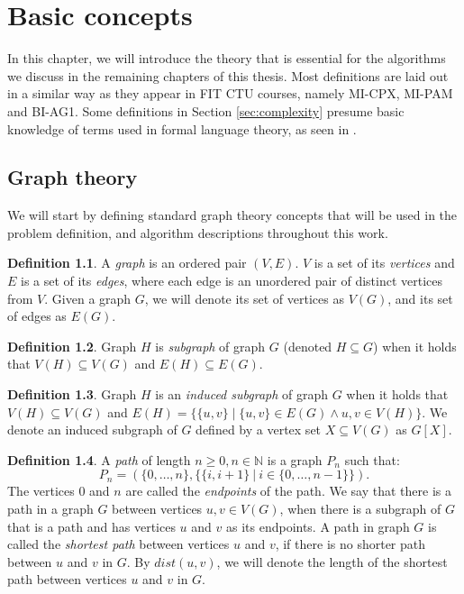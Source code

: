 \documentclass[thesis=M,english,hidelinks]{FITthesis}[2012/10/20]
\theoremstyle{definition}
\newtheorem{definition}{Definition}
\begin{document}

\chapter{Basic concepts}

In this chapter, we will introduce the theory that is essential for the algorithms we discuss in the remaining chapters of
this thesis. Most definitions are laid out in a similar way as they appear in FIT CTU courses, namely MI-CPX, MI-PAM and
BI-AG1. Some definitions in Section \ref{sec:complexity} presume basic knowledge of terms used in formal language
theory, as seen in \cite[p. 11]{Melichar2013}.

\section{Graph theory}

We will start by defining standard graph theory concepts that will be used in the problem definition, and algorithm
descriptions throughout this work. 

\begin{definition}
    A \emph{graph} is an ordered pair $(V, E)$. $V$ is a set of its \emph{vertices} and $E$ is a set of
    its \emph{edges}, where each edge is an unordered pair of distinct vertices from $V$. Given a graph $G$, we will
    denote its set of vertices as $V(G)$, and its set of edges as $E(G)$.
\end{definition}

\begin{definition}
    Graph $H$ is \emph{subgraph} of graph $G$ (denoted $H \subseteq G$) when it holds that $V(H) \subseteq V(G)$ and
    $E(H) \subseteq E(G)$.
\end{definition}

\begin{definition}
    Graph $H$ is an \emph{induced subgraph} of graph $G$ when it holds that $V(H) \subseteq V(G)$ and
    $E(H) = \{\{u, v\} \mid \{u, v\} \in E(G) \land u, v \in V(H)\}$. We denote an induced subgraph of $G$ defined by a
    vertex set $X \subseteq V(G)$ as $G[X]$.
\end{definition}

\begin{definition}
    A \emph{path} of length $n \geq 0, n \in \mathbb{N}$ is a graph $P_n$ such that:
    $$
    P_n = (\{0, \ldots, n\}, \{\{i, i+1\}\ |\ i \in \{0, \ldots, n-1\}\}).
    $$
    The vertices $0$ and $n$ are called the \emph{endpoints} of the path. We say that there is a path in a graph $G$
    between vertices $u, v \in V(G)$, when there is a subgraph of $G$ that is a path and has vertices $u$ and $v$ as
    its endpoints. A path in graph $G$ is called the \emph{shortest path} between vertices $u$ and $v$, if there is no
    shorter path between $u$ and $v$ in $G$. By $dist(u, v)$, we will denote the length of the shortest path between
    vertices $u$ and $v$ in $G$.
\end{definition}
\end{document}
